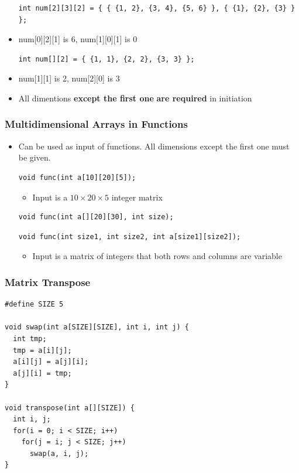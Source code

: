 \documentclass{../c-lecture}
\begin{document}
\begin{frame}[fragile]
  \begin{itemize}
    \begin{verbatim}
int num[2][3][2] = { { {1, 2}, {3, 4}, {5, 6} }, { {1}, {2}, {3} } };
    \end{verbatim}
    \item num[0][2][1] is 6, num[1][0][1] is 0
    \begin{verbatim}
int num[][2] = { {1, 1}, {2, 2}, {3, 3} };
    \end{verbatim}
    \item num[1][1] is 2, num[2][0] is 3
    \item
      All dimentions
      \textbf{\color{Orange} except the first one} \textbf{\color{Yellow} are required} in
      initiation
  \end{itemize}
\end{frame}

\begin{frame}[fragile]
  \frametitle{Multidimensional Arrays in Functions}
  \begin{itemize}
    \item
      Can be used as input of functions. All dimensions except the first one
      {\color{YellowOrange} must} be given.

    \begin{verbatim}
void func(int a[10][20][5]);
    \end{verbatim}
    \begin{itemize}
      \item Input is a $10 \times 20 \times 5$ integer matrix
    \end{itemize}
    \begin{verbatim}
void func(int a[][20][30], int size);
    \end{verbatim}
    \begin{verbatim}
void func(int size1, int size2, int a[size1][size2]);
    \end{verbatim}
    \begin{itemize}
      \item
        Input is a matrix of integers that both rows and columns are variable

    \end{itemize}
  \end{itemize}
\end{frame}

\begin{frame}[fragile]
  \frametitle{Matrix Transpose}
  \begin{verbatim}
#define SIZE 5

void swap(int a[SIZE][SIZE], int i, int j) {
  int tmp;
  tmp = a[i][j];
  a[i][j] = a[j][i];
  a[j][i] = tmp;
}

void transpose(int a[][SIZE]) {
  int i, j;
  for(i = 0; i < SIZE; i++)
    for(j = i; j < SIZE; j++)
      swap(a, i, j);
}
  \end{verbatim}
\end{frame}
\end{document}
